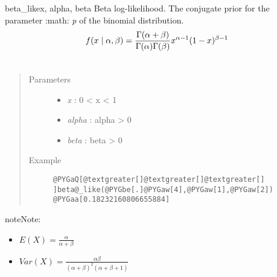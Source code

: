 \hypertarget{pymc.distributions.beta_like}{}\begin{funcdesc}{beta\_like}{x, alpha, beta}
Beta log-likelihood. The conjugate prior for the parameter :math: \emph{p} of the binomial distribution.
\begin{gather}
\begin{split}f(x \mid \alpha, \beta) = \frac{\Gamma(\alpha + \beta)}{\Gamma(\alpha) \Gamma(\beta)} x^{\alpha - 1} (1 - x)^{\beta - 1}\end{split}\notag\\\begin{split}\end{split}\notag
\end{gather}\begin{quote}\begin{description}
\item[Parameters] \leavevmode\begin{itemize}
\item {} 
\emph{x} : 0 \textless{} x \textless{} 1

\item {} 
\emph{alpha} : alpha \textgreater{} 0

\item {} 
\emph{beta} : beta \textgreater{} 0

\end{itemize}

\item[Example] \leavevmode
\begin{Verbatim}[commandchars=@\[\]]
@PYGaQ[@textgreater[]@textgreater[]@textgreater[] ]beta@_like(@PYGbe[.]@PYGaw[4],@PYGaw[1],@PYGaw[2])
@PYGaa[0.18232160806655884]
\end{Verbatim}

\end{description}\end{quote}

\begin{notice}{note}{Note:}\begin{itemize}
\item {} 
$E(X)=\frac{\alpha}{\alpha+\beta}$

\item {} 
$Var(X)=\frac{\alpha \beta}{(\alpha+\beta)^2(\alpha+\beta+1)}$

\end{itemize}
\end{notice}
\end{funcdesc}

